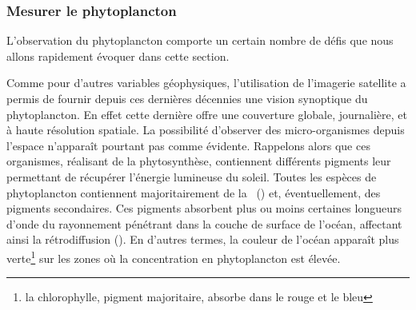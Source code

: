 
\begin{figure}
  \centering
  \label{fig:pompe-bio}
\end{figure}

\subsubsection{Mesurer le phytoplancton}
\label{sec:teledetection}

\begin{figure}
  \centering

  \label{fig:oc-fine-illustration}
\end{figure}

L'observation du phytoplancton comporte un certain nombre de défis que nous allons rapidement évoquer dans cette section.

Comme pour d'autres variables géophysiques, l'utilisation de l'imagerie satellite a permis de fournir depuis ces dernières décennies une vision synoptique du phytoplancton.
En effet cette dernière offre une couverture globale, journalière, et à haute résolution spatiale.
La possibilité d'observer des micro-organismes depuis l'espace n'apparaît pourtant pas comme évidente.
Rappelons alors que ces organismes, réalisant de la phytosynthèse, contiennent différents pigments leur permettant de récupérer l'énergie lumineuse du soleil.
Toutes les espèces de phytoplancton contiennent majoritairement de la ~() et, éventuellement, des pigments secondaires.
Ces pigments absorbent plus ou moins certaines longueurs d'onde du rayonnement pénétrant dans la couche de surface de l'océan, affectant ainsi la rétrodiffusion ().
En d'autres termes, la couleur de l'océan apparaît plus verte\footnote{%
  la chlorophylle, pigment majoritaire, absorbe dans le rouge et le bleu}
sur les zones où la concentration en phytoplancton est élevée.

